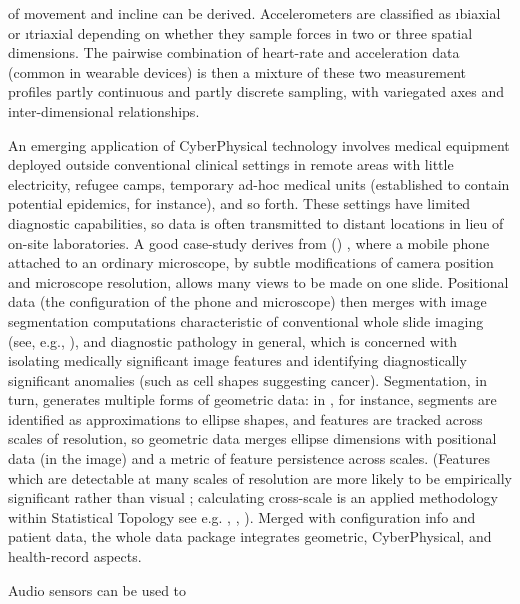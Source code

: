 {\begin{description}
of movement and incline can be derived.  Accelerometers are 
classified as \i{biaxial} or \i{triaxial} depending on 
whether they sample forces in two or three spatial 
dimensions.  
\pseudoIndent{}
The pairwise combination of heart-rate and acceleration data
(common in wearable devices) is then a mixture of these
two measurement profiles \mdash{} partly continuous and
partly discrete sampling, with variegated axes and
inter-dimensional relationships.  
\item[Remote Medical Diagnosis]  An emerging application of 
CyberPhysical technology involves medical equipment 
deployed outside conventional clinical settings 
\mdash{} in remote areas with little electricity, refugee 
camps, temporary ad-hoc medical units (established 
to contain potential epidemics, for instance), and 
so forth.  These settings have limited diagnostic 
capabilities, so data is often transmitted to distant 
locations in lieu of on-site laboratories.  
\pseudoIndent{}
A good case-study derives from  
(\mWSI{}) \cite{Auguste}, where a mobile 
phone attached to an ordinary microscope, 
by subtle modifications of camera position and microscope 
resolution, allows many views to be made on one slide.  
Positional data (the configuration of the phone and microscope) 
then merges with image segmentation 
computations characteristic of 
conventional whole slide imaging (see, e.g., 
\cite{Farahani}), and diagnostic pathology 
in general, which 
is concerned with isolating medically significant image 
features and identifying diagnostically significant 
anomalies (such as cell shapes 
suggesting cancer). 
\pseudoIndent{}
Segmentation, in turn, 
generates multiple forms of geometric data: in 
\cite{KaleAksoy}, for instance, segments are 
identified as approximations to ellipse shapes, 
and features are tracked across scales of resolution, 
so geometric data merges ellipse dimensions with 
positional data (in the image) and a metric 
of feature persistence across scales.  
(Features which are detectable at many scales of 
resolution are more likely to be empirically 
significant rather than visual ; calculating 
cross-scale  is an applied 
methodology within Statistical Topology \mdash{} 
see e.g. \cite{EdelsbrunnerHarer}, 
\cite{HaneyMaxwell}, \cite{HarryStrange}).  
Merged with \mWSI{} configuration info and patient data, the 
whole data package integrates geometric, CyberPhysical, 
and health-record aspects. 
\item[Speech Sampling]  Audio sensors can be used to 

\end{description}}
